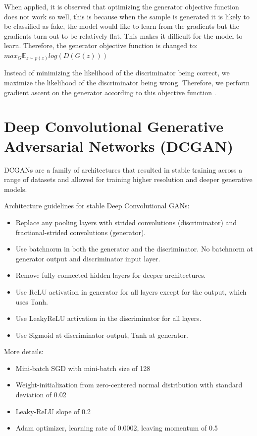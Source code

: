 \documentclass{scrartcl}
\begin{document}
When applied, it is observed that optimizing the generator objective function does not work so well, this is because when the sample is generated it is likely to be classified as fake, the model would like to learn from the gradients but the gradients turn out to be relatively flat. This makes it difficult for the model to learn. Therefore, the generator objective function is changed to: $max_{G} \mathbb{E}_{z \sim{}p(z)} log(D(G(z)))$

Instead of minimizing the likelihood of the discriminator being correct, we maximize the likelihood of the discriminator being wrong. Therefore, we perform gradient ascent on the generator according to this objective function \cite{gansexpl-tds}.

\section{Deep Convolutional Generative Adversarial Networks (DCGAN)}
DCGANs are a family of architectures that resulted in stable training across a range of datasets and allowed for training higher
resolution and deeper generative models.

Architecture guidelines for stable Deep Convolutional GANs:
\begin{itemize}
	\item Replace any pooling layers with strided convolutions (discriminator) and fractional-strided convolutions (generator).
	\item Use batchnorm in both the generator and the discriminator. No batchnorm at generator output and discriminator input layer.
	\item Remove fully connected hidden layers for deeper architectures.
	\item Use ReLU activation in generator for all layers except for the output, which uses Tanh.
	\item Use LeakyReLU activation in the discriminator for all layers.
	\item Use Sigmoid at discriminator output, Tanh at generator.
\end{itemize}

More details:
\begin{itemize}
	\item
		Mini-batch SGD with mini-batch size of 128
	\item
		Weight-initialization from zero-centered normal distribution with standard deviation of 0.02
	\item
		Leaky-ReLU slope of 0.2
	\item
		Adam optimizer, learning rate of 0.0002, leaving momentum of 0.5
\end{itemize}
\end{document}
